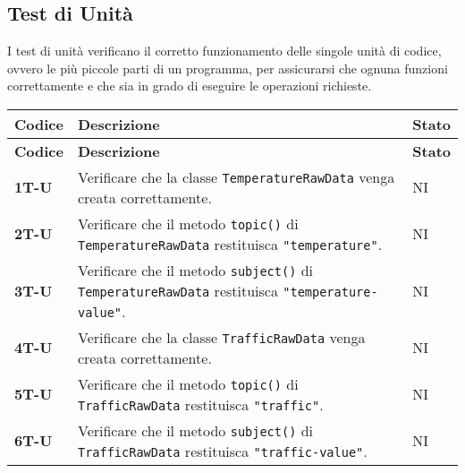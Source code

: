 \subsection{Test di Unità}
I test di unità verificano il corretto funzionamento delle singole unità di codice, ovvero le più piccole parti di un programma,
per assicurarsi che ognuna funzioni correttamente e che sia in grado di eseguire le operazioni richieste. \\
\begin{longtable}{|>{\raggedright\arraybackslash}m{}|>{\raggedright\arraybackslash}m{}|>{\raggedright\arraybackslash}m{}|}
	\hline
	\textbf{Codice} & \textbf{Descrizione}                                                                                                                                              & \textbf{Stato} \\
	\hline
	\endfirsthead
	\hline
	\textbf{Codice} & \textbf{Descrizione}                                                                                                                                              & \textbf{Stato} \\
	\endhead
	\hline
	\textbf{1T-U}   & Verificare che la classe \texttt{TemperatureRawData} venga creata correttamente.                                                                                  & NI             \\
	\hline
	\textbf{2T-U}   & Verificare che il metodo \texttt{topic()} di \texttt{TemperatureRawData} restituisca \texttt{"temperature"}.                                                      & NI             \\
	\hline
	\textbf{3T-U}   & Verificare che il metodo \texttt{subject()} di \texttt{TemperatureRawData} restituisca \texttt{"temperature-value"}.                                              & NI             \\
	\hline
	\textbf{4T-U}   & Verificare che la classe \texttt{TrafficRawData} venga creata correttamente.                                                                                      & NI             \\
	\hline
	\textbf{5T-U}   & Verificare che il metodo \texttt{topic()} di \texttt{TrafficRawData} restituisca \texttt{"traffic"}.                                                              & NI             \\
	\hline
	\textbf{6T-U}   & Verificare che il metodo \texttt{subject()} di \texttt{TrafficRawData} restituisca \texttt{"traffic-value"}.                                                      & NI             \\

\end{longtable}
